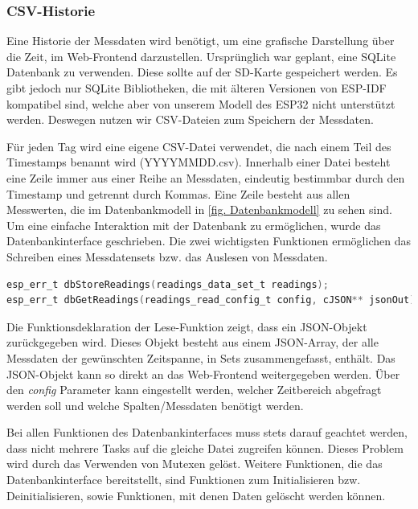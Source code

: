 \subsubsection{CSV-Historie}\label{csvhistory}
Eine Historie der Messdaten wird benötigt, um eine grafische Darstellung über die Zeit, im Web-Frontend darzustellen.
Ursprünglich war geplant, eine SQLite Datenbank zu verwenden.
Diese sollte auf der SD-Karte gespeichert werden.
Es gibt jedoch nur SQLite Bibliotheken, die mit älteren Versionen von ESP-IDF kompatibel sind, welche aber von unserem Modell des ESP32 nicht unterstützt werden.
Deswegen nutzen wir CSV-Dateien zum Speichern der Messdaten.

Für jeden Tag wird eine eigene CSV-Datei verwendet, die nach einem Teil des Timestamps benannt wird (YYYYMMDD.csv).
Innerhalb einer Datei besteht eine Zeile immer aus einer Reihe an Messdaten, eindeutig bestimmbar durch den Timestamp und getrennt durch Kommas.
Eine Zeile besteht aus allen Messwerten, die im Datenbankmodell in \autoref{fig. Datenbankmodell} zu sehen sind.
Um eine einfache Interaktion mit der Datenbank zu ermöglichen, wurde das Datenbankinterface geschrieben.
Die zwei wichtigsten Funktionen ermöglichen das Schreiben eines Messdatensets bzw. das Auslesen von Messdaten.

\begin{lstlisting}[language=C]
esp_err_t dbStoreReadings(readings_data_set_t readings);
esp_err_t dbGetReadings(readings_read_config_t config, cJSON** jsonOut);
\end{lstlisting}

Die Funktionsdeklaration der Lese-Funktion zeigt, dass ein JSON-Objekt zurückgegeben wird.
Dieses Objekt besteht aus einem JSON-Array, der alle Messdaten der gewünschten Zeitspanne, in Sets zusammengefasst, enthält.
Das JSON-Objekt kann so direkt an das Web-Frontend weitergegeben werden.
Über den \textit{config} Parameter kann eingestellt werden, welcher Zeitbereich abgefragt werden soll und welche Spalten/Messdaten benötigt werden.

Bei allen Funktionen des Datenbankinterfaces muss stets darauf geachtet werden, dass nicht mehrere Tasks auf die gleiche Datei zugreifen können.
Dieses Problem wird durch das Verwenden von Mutexen gelöst.
Weitere Funktionen, die das Datenbankinterface bereitstellt, sind Funktionen zum Initialisieren bzw. Deinitialisieren, sowie Funktionen, mit denen Daten gelöscht werden können.

